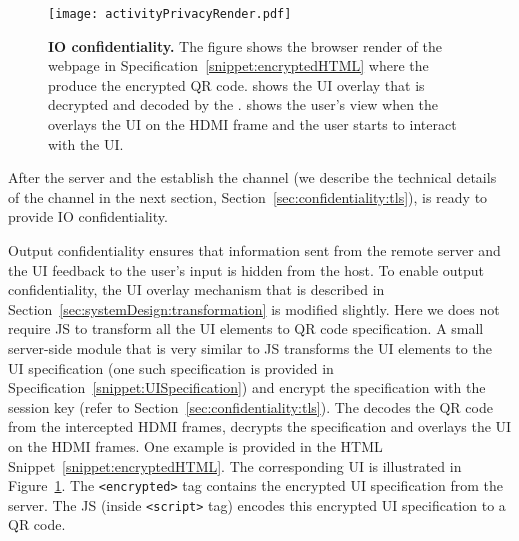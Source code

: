 \begin{figure}[t]
\centering
\texttt{[image: activityPrivacyRender.pdf]}
\caption{\textbf{\name IO confidentiality.} The figure shows \one the browser render of the webpage in Specification~\ref{snippet:encryptedHTML} where the \name \js produce the encrypted QR code. \two shows the UI overlay that is decrypted and decoded by the \device. \three shows the user's view when the \device overlays the UI on the HDMI frame and the user starts to interact with the UI.}

\spacesave
\label{fig:activityPrivacy}
\centering
\end{figure}

After the server and the \device establish the \tls channel (we describe the technical details of the \tls channel in the next section, Section~\ref{sec:confidentiality:tls}), \name is ready to provide IO confidentiality.

 Output confidentiality ensures that information sent from the remote server and the UI feedback to the user's input is hidden from the host. To enable output confidentiality, the UI overlay mechanism that is described in Section~\ref{sec:systemDesign:transformation} is modified slightly. Here we \name does not require \name JS to transform all the UI elements to QR code specification. A small server-side module that is very similar to \name JS transforms the UI elements to the UI specification (one such specification is provided in Specification~\ref{snippet:UISpecification}) and encrypt the specification with the \tls session key (refer to Section~\ref{sec:confidentiality:tls}). The \device decodes the QR code from the intercepted HDMI frames, decrypts the specification and overlays the UI on the HDMI frames. One example is provided in the HTML Snippet~\ref{snippet:encryptedHTML}. The corresponding UI is illustrated in Figure~\ref{fig:activityPrivacy}. The \texttt{<encrypted>} tag contains the encrypted UI specification from the server. The \name JS (inside \texttt{<script>} tag) encodes this encrypted UI specification to a QR code.

